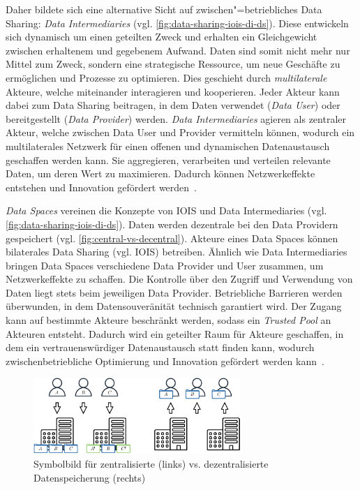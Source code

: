 Daher bildete sich eine alternative Sicht auf zwischen"=betriebliches Data Sharing: \emph{Data Intermediaries} (vgl. \autoref{fig:data-sharing-iois-di-ds}).
Diese entwickeln sich dynamisch um einen geteilten Zweck und erhalten ein Gleichgewicht zwischen erhaltenem und gegebenem Aufwand.
Daten sind somit nicht mehr nur Mittel zum Zweck, sondern eine strategische Ressource, um neue Geschäfte zu ermöglichen und Prozesse zu optimieren.
Dies geschieht durch \emph{multilaterale} Akteure, welche miteinander interagieren und kooperieren.
Jeder Akteur kann dabei zum Data Sharing beitragen, in dem Daten verwendet (\emph{Data User}) oder bereitgestellt (\emph{Data Provider}) werden.
\emph{Data Intermediaries} agieren als zentraler Akteur, welche zwischen Data User und Provider vermitteln können, wodurch ein  multilaterales Netzwerk für einen offenen und dynamischen Datenaustausch geschaffen werden kann.
Sie aggregieren, verarbeiten und verteilen relevante Daten, um deren Wert zu maximieren.
Dadurch können Netzwerkeffekte entstehen und Innovation gefördert werden~\cite{mollerIndustrialDataEcosystems2024}.

\emph{Data Spaces} vereinen die Konzepte von IOIS und Data Intermediaries (vgl. \autoref{fig:data-sharing-iois-di-ds}).
Daten werden dezentrale bei den Data Providern gespeichert (vgl. \autoref{fig:central-vs-decentral}). %
Akteure eines Data Spaces können bilaterales Data Sharing (vgl. IOIS) betreiben.
Ähnlich wie Data Intermediaries bringen Data Spaces verschiedene Data Provider und User zusammen, um Netzwerkeffekte zu schaffen.
Die Kontrolle über den Zugriff und Verwendung von Daten liegt stets beim jeweiligen Data Provider.
Betriebliche Barrieren werden überwunden, in dem Datensouveränität technisch garantiert wird.
Der Zugang kann auf bestimmte Akteure beschränkt werden, sodass ein \emph{Trusted Pool} an Akteuren entsteht.
Dadurch wird ein geteilter Raum für Akteure geschaffen, in dem ein vertrauenswürdiger Datenaustausch statt finden kann, wodurch zwischenbetriebliche Optimierung und Innovation gefördert werden kann~\cite{mollerIndustrialDataEcosystems2024}.

\begin{figure}[b]
    \includegraphics[width=0.7\textwidth]{./assets/central_vs_decentral.drawio.pdf}
    \caption{Symbolbild für zentralisierte (links) vs. dezentralisierte Datenspeicherung (rechts)}
    \label{fig:central-vs-decentral}
\end{figure}

